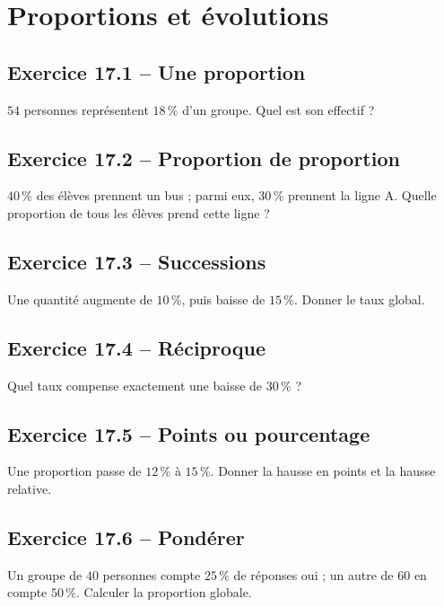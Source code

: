 \chapter{Proportions et évolutions}
\section*{Exercice 17.1 -- Une proportion}
$54$ personnes représentent $18\,\%$ d'un groupe. Quel est son effectif ?

\section*{Exercice 17.2 -- Proportion de proportion}
$40\,\%$ des élèves prennent un bus ; parmi eux, $30\,\%$ prennent la ligne A. Quelle proportion de tous les élèves prend cette ligne ?

\section*{Exercice 17.3 -- Successions}
Une quantité augmente de $10\,\%$, puis baisse de $15\,\%$. Donner le taux global.

\section*{Exercice 17.4 -- Réciproque}
Quel taux compense exactement une baisse de $30\,\%$ ?

\section*{Exercice 17.5 -- Points ou pourcentage}
Une proportion passe de $12\,\%$ à $15\,\%$. Donner la hausse en points et la hausse relative.

\section*{Exercice 17.6 -- Pondérer}
Un groupe de $40$ personnes compte $25\,\%$ de réponses oui ; un autre de $60$ en compte $50\,\%$. Calculer la proportion globale.
